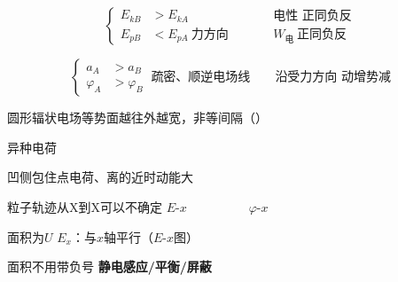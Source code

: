 \[
\left\{\begin{aligned}
E_{kB}&>E_{kA}\\
E_{pB}&<E_{pA}\ \text{力方向}
\end{aligned}\right.
\qquad
\begin{aligned}
&\text{电性\ 正同负反}\\
&W_{\text{电}}\ \text{正同负反}
\end{aligned}
\]

\[
\left\{\begin{aligned}
a_A&>a_B\\
\varphi_A&>\varphi_B
\end{aligned}\right.
\ \text{疏密、顺逆电场线}
\qquad
\text{沿受力方向\ 动增势减}
\]

圆形辐状电场等势面越往外越宽，非等间隔（）

异种电荷

凹侧包住点电荷、离的近时动能大

粒子轨迹从X到X可以不确定
\noindent $E$-$x$　　　　　$\varphi$-$x$

\noindent 面积为$U$
\noindent $E_x$：与$x$轴平行（$E$-$x$图）%

\noindent 面积不用带负号
\textbf{静电感应/平衡/屏蔽}

